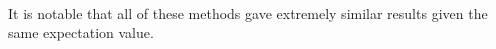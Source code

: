 \documentclass[11pt]{article}
\begin{document}
    \begin{center}
    \end{center}
    { \hspace*{\fill} \\}
    
    It is notable that all of these methods gave extremely similar results
given the same expectation value.


    
    
    
    
\end{document}
